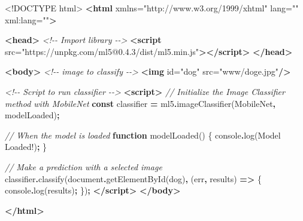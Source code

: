 \documentclass[
]{krantz}
\makeatletter
\newenvironment{Shaded}{\begin{snugshade}}{\end{snugshade}}
\newcommand{\BuiltInTok}[1]{#1}
\newcommand{\CommentTok}[1]{\textcolor[rgb]{0.37,0.37,0.37}{\textit{#1}}}
\newcommand{\DataTypeTok}[1]{\textcolor[rgb]{0.27,0.27,0.27}{#1}}
\newcommand{\FunctionTok}[1]{\textcolor[rgb]{0,0,0}{#1}}
\newcommand{\KeywordTok}[1]{\textcolor[rgb]{0.27,0.27,0.27}{\textbf{#1}}}
\newcommand{\NormalTok}[1]{#1}
\newcommand{\OperatorTok}[1]{\textcolor[rgb]{0.43,0.43,0.43}{\textbf{#1}}}
\newcommand{\OtherTok}[1]{\textcolor[rgb]{0.37,0.37,0.37}{#1}}
\newcommand{\StringTok}[1]{\textcolor[rgb]{0.5,0.5,0.5}{#1}}
\newenvironment{kframe}{%
\medskip{}
\setlength{\fboxsep}{.8em}
 \def\at@end@of@kframe{}%
 \ifinner\ifhmode%
  \def\at@end@of@kframe{\end{minipage}}%
  \begin{minipage}{\columnwidth}%
 \fi\fi%
 \def\FrameCommand##1{\hskip\@totalleftmargin \hskip-\fboxsep
 \colorbox{shadecolor}{##1}\hskip-\fboxsep
     \hskip-\linewidth \hskip-\@totalleftmargin \hskip\columnwidth}%
 \MakeFramed {\advance\hsize-\width
   \@totalleftmargin\z@ \linewidth\hsize
   \@setminipage}}%
 {\par\unskip\endMakeFramed%
 \at@end@of@kframe}
\renewenvironment{Shaded}{\begin{kframe}}{\end{kframe}}
\makeatother
\begin{document}
\begin{Shaded}
\begin{Highlighting}[]
\DataTypeTok{\textless{}!DOCTYPE }\NormalTok{html}\DataTypeTok{\textgreater{}}
\KeywordTok{\textless{}html}\OtherTok{ xmlns=}\StringTok{"http://www.w3.org/1999/xhtml"}\OtherTok{ lang=}\StringTok{""}\OtherTok{ xml:lang=}\StringTok{""}\KeywordTok{\textgreater{}}

\KeywordTok{\textless{}head\textgreater{}}
  \CommentTok{\textless{}!{-}{-} Import library {-}{-}\textgreater{}}
  \KeywordTok{\textless{}script}\OtherTok{ src=}\StringTok{"https://unpkg.com/ml5@0.4.3/dist/ml5.min.js"}\KeywordTok{\textgreater{}\textless{}/script\textgreater{}}
\KeywordTok{\textless{}/head\textgreater{}}

\KeywordTok{\textless{}body\textgreater{}}
  \CommentTok{\textless{}!{-}{-} image to classify {-}{-}\textgreater{}}
  \KeywordTok{\textless{}img}\OtherTok{ id=}\StringTok{"dog"}\OtherTok{ src=}\StringTok{"www/doge.jpg"}\KeywordTok{/\textgreater{}}

  \CommentTok{\textless{}!{-}{-} Script to run classifier {-}{-}\textgreater{}}
  \KeywordTok{\textless{}script\textgreater{}}
    \CommentTok{// Initialize the Image Classifier method with MobileNet}
    \KeywordTok{const}\NormalTok{ classifier }\OperatorTok{=}\NormalTok{ ml5}\OperatorTok{.}\FunctionTok{imageClassifier}\NormalTok{(}\StringTok{\textquotesingle{}MobileNet\textquotesingle{}}\OperatorTok{,}\NormalTok{ modelLoaded)}\OperatorTok{;}

    \CommentTok{// When the model is loaded}
    \KeywordTok{function} \FunctionTok{modelLoaded}\NormalTok{() \{}
      \BuiltInTok{console}\OperatorTok{.}\FunctionTok{log}\NormalTok{(}\StringTok{\textquotesingle{}Model Loaded!\textquotesingle{}}\NormalTok{)}\OperatorTok{;}
\NormalTok{    \}}

    \CommentTok{// Make a prediction with a selected image}
\NormalTok{    classifier}\OperatorTok{.}\FunctionTok{classify}\NormalTok{(}\BuiltInTok{document}\OperatorTok{.}\FunctionTok{getElementById}\NormalTok{(}\StringTok{\textquotesingle{}dog\textquotesingle{}}\NormalTok{)}\OperatorTok{,}\NormalTok{ (err}\OperatorTok{,}\NormalTok{ results) }\KeywordTok{=\textgreater{}}\NormalTok{ \{}
      \BuiltInTok{console}\OperatorTok{.}\FunctionTok{log}\NormalTok{(results)}\OperatorTok{;}
\NormalTok{    \})}\OperatorTok{;}
  \KeywordTok{\textless{}/script\textgreater{}}
\KeywordTok{\textless{}/body\textgreater{}}

\KeywordTok{\textless{}/html\textgreater{}}
\end{Highlighting}
\end{Shaded}
\end{document}
